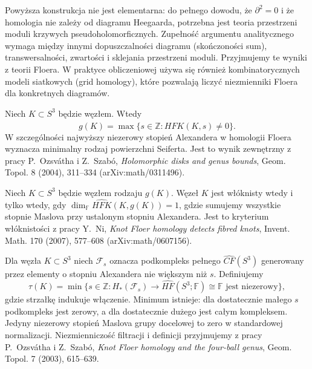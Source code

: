 \begin{uwaga}
Powyższa konstrukcja nie jest elementarna: do
pełnego dowodu, że $\partial^2=0$ i że homologia
nie zależy od diagramu Heegaarda, potrzebna jest
teoria przestrzeni moduli krzywych pseudoholomorficznych.
Zupełność argumentu analitycznego wymaga między innymi
dopuszczalności diagramu (skończoności sum),
transwersalności, zwartości i sklejania przestrzeni moduli.
Przyjmujemy te wyniki z teorii Floera.
W praktyce obliczeniowej używa się również kombinatorycznych
modeli siatkowych (grid homology), które pozwalają liczyć
niezmienniki Floera dla konkretnych diagramów.
\end{uwaga}

\begin{twierdzenie}
Niech $K\subset S^3$ będzie węzłem. Wtedy
\[
g(K)=\max\{s\in\mathbb Z:\widehat{HFK}(K,s)\ne0\}.
\]
W szczególności najwyższy niezerowy stopień Alexandera
w homologii Floera wyznacza minimalny rodzaj powierzchni
Seiferta. Jest to wynik zewnętrzny z pracy
P.~Ozsvátha i Z.~Szabó, \emph{Holomorphic disks and genus bounds},
Geom. Topol. 8 (2004), 311--334 (arXiv:math/0311496).
\end{twierdzenie}

\begin{twierdzenie}
Niech $K\subset S^3$ będzie węzłem rodzaju $g(K)$.
Węzeł $K$ jest włóknisty wtedy i tylko wtedy, gdy
$\dim_{\mathbb F}\widehat{HFK}(K,g(K))=1$,
gdzie sumujemy wszystkie stopnie Maslova przy ustalonym
stopniu Alexandera. Jest to kryterium włóknistości
z pracy Y.~Ni, \emph{Knot Floer homology detects fibred knots},
Invent. Math. 170 (2007), 577--608 (arXiv:math/0607156).
\end{twierdzenie}

\begin{definicja}
Dla węzła $K\subset S^3$ niech $\mathcal F_s$
oznacza podkompleks pełnego $\widehat{CF}(S^3)$
generowany przez elementy o stopniu Alexandera
nie większym niż $s$. Definiujemy
\[
 \tau(K)=\min\{s\in\mathbb Z:
 H_*(\mathcal F_s)\longrightarrow
 \widehat{HF}(S^3;\mathbb F)\cong\mathbb F
 \text{ jest niezerowy}\},
\]
gdzie strzałkę indukuje włączenie.
Minimum istnieje: dla dostatecznie małego $s$
podkompleks jest zerowy, a dla dostatecznie
dużego jest całym kompleksem.
Jedyny niezerowy stopień Maslova grupy docelowej
to zero w standardowej normalizacji.
Niezmienniczość filtracji i definicji przyjmujemy
z pracy P.~Ozsvátha i Z.~Szabó,
\emph{Knot Floer homology and the four-ball genus},
Geom. Topol. 7 (2003), 615--639.
\end{definicja}

